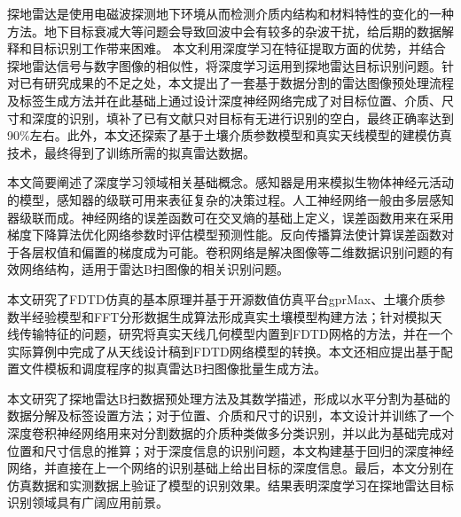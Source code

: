 \begin{chineseabstract}
探地雷达是使用电磁波探测地下环境从而检测介质内结构和材料特性的变化的一种方法。地下目标衰减大等问题会导致回波中会有较多的杂波干扰，给后期的数据解释和目标识别工作带来困难。
本文利用深度学习在特征提取方面的优势，并结合探地雷达信号与数字图像的相似性，将深度学习运用到探地雷达目标识别问题。针对已有研究成果的不足之处，本文提出了一套基于数据分割的雷达图像预处理流程及标签生成方法并在此基础上通过设计深度神经网络完成了对目标位置、介质、尺寸和深度的识别，填补了已有文献只对目标有无进行识别的空白，最终正确率达到90\%左右。此外，本文还探索了基于土壤介质参数模型和真实天线模型的建模仿真技术，最终得到了训练所需的拟真雷达数据。

本文简要阐述了深度学习领域相关基础概念。感知器是用来模拟生物体神经元活动的模型，感知器的级联可用来表征复杂的决策过程。人工神经网络一般由多层感知器级联而成。神经网络的误差函数可在交叉熵的基础上定义，误差函数用来在采用梯度下降算法优化网络参数时评估模型预测性能。反向传播算法使计算误差函数对于各层权值和偏置的梯度成为可能。卷积网络是解决图像等二维数据识别问题的有效网络结构，适用于雷达B扫图像的相关识别问题。

本文研究了FDTD仿真的基本原理并基于开源数值仿真平台gprMax、土壤介质参数半经验模型和FFT分形数据生成算法形成真实土壤模型构建方法；针对模拟天线传输特征的问题，研究将真实天线几何模型内置到FDTD网格的方法，并在一个实际算例中完成了从天线设计稿到FDTD网络模型的转换。本文还相应提出基于配置文件模板和调度程序的拟真雷达B扫图像批量生成方法。

本文研究了探地雷达B扫数据预处理方法及其数学描述，形成以水平分割为基础的数据分解及标签设置方法；对于位置、介质和尺寸的识别，本文设计并训练了一个深度卷积神经网络用来对分割数据的介质种类做多分类识别，并以此为基础完成对位置和尺寸信息的推算；对于深度信息的识别问题，本文构建基于回归的深度神经网络，并直接在上一个网络的识别基础上给出目标的深度信息。最后，本文分别在仿真数据和实测数据上验证了模型的识别效果。结果表明深度学习在探地雷达目标识别领域具有广阔应用前景。

\end{chineseabstract}

